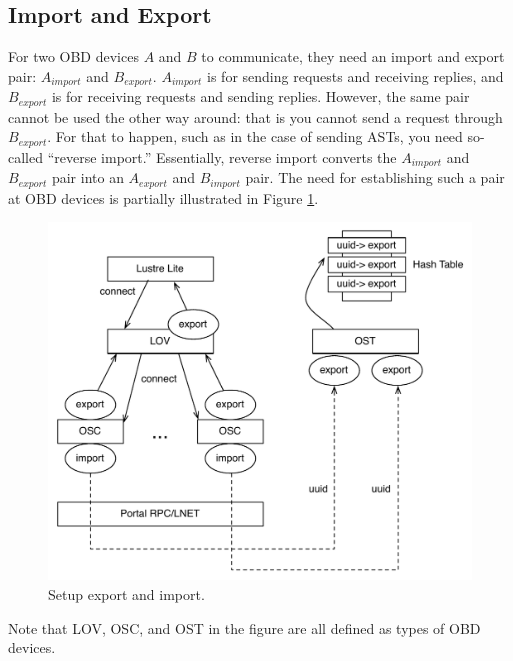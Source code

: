 \subsection{Import and Export}

For two OBD devices $A$ and $B$ to communicate, they need an import and export
pair: $A_{import}$ and $B_{export}$. $A_{import}$ is for sending requests and
receiving replies, and $B_{export}$ is for receiving requests and sending
replies.  However, the same pair cannot be used the other way around: that is 
you cannot send a request through $B_{export}$. For that to happen, such as in
the case of sending ASTs, you need so-called ``reverse import.'' Essentially,
reverse import converts the $A_{import}$ and $B_{export}$ pair into an $A_{export}$
and $B_{import}$ pair. The need for establishing such a pair at OBD
devices is partially illustrated in Figure \ref{fig:exp}.


\begin{figure}[htb]
\centering
\includegraphics[width=4.5in]{img/lustre_exp}
\caption{Setup export and import.}
\label{fig:exp}
\end{figure}

Note that LOV, OSC, and OST in the figure are all defined as types of OBD
devices.

